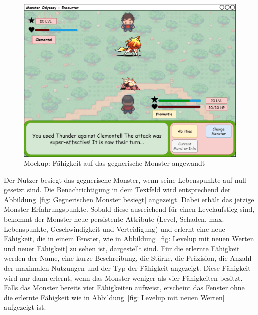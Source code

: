 \begin{figure}[H]
    \center
    \includegraphics[scale=\scale]{images/mockups/Encounter/Encounter1v1AbilitiesUsed.png}
    \caption{Mockup: Fähigkeit auf das gegnerische Monster angewandt}
    \label{fig: Fähigkeit auf den gegnerischen Monster angewandt}
\end{figure}
Der Nutzer besiegt das gegnerische Monster, wenn seine Lebenspunkte auf null gesetzt sind.
Die Benachrichtigung in dem Textfeld wird entsprechend der Abbildung~\ref{fig: Gegnerischen Monster besiegt} angezeigt. 
Dabei erhält das jetzige Monster Erfahrungspunkte.
Sobald diese ausreichend für einen Levelaufstieg sind, bekommt der Monster neue persistente Attribute (Level, Schaden, max. Lebenspunkte, Geschwindigkeit und Verteidigung) und erlernt eine neue Fähigkeit, die in einem Fenster, wie in Abbildung~\ref{fig: Levelup mit neuen Werten und neuer Fähigkeit} zu sehen ist, dargestellt sind. 
Für die erlernte Fähigkeit werden der Name, eine kurze Beschreibung, die Stärke, die Präzision, die Anzahl der maximalen Nutzungen und der Typ der Fähigkeit angezeigt. 
Diese Fähigkeit wird nur dann erlernt, wenn das Monster weniger als vier Fähigkeiten besitzt.
Falls das Monster bereits vier Fähigkeiten aufweist, erscheint das Fenster ohne die erlernte Fähigkeit wie in Abbildung~\ref{fig: Levelup mit neuen Werten} aufgezeigt ist.

